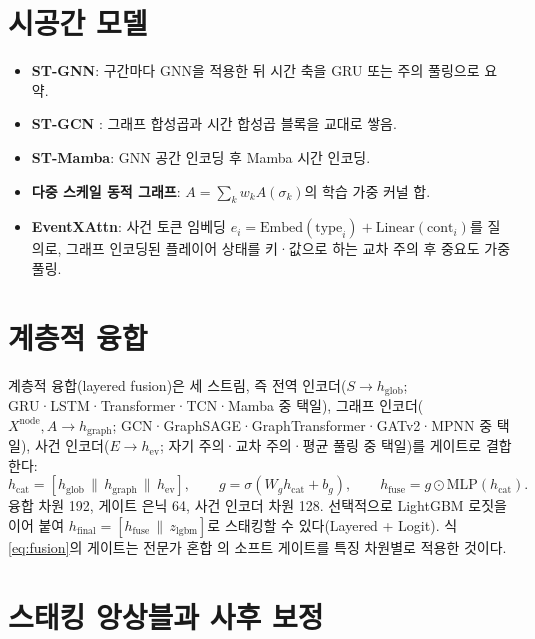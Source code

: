 \section{시공간 모델}
\label{sec:model-st}

\begin{itemize}[leftmargin=1.5em]
  \item \textbf{ST-GNN}: 구간마다 GNN을 적용한 뒤 시간 축을 GRU 또는 주의 풀링으로 요약.
  \item \textbf{ST-GCN} \cite{yan2018spatial}: 그래프 합성곱과 시간 합성곱 블록을 교대로 쌓음.
  \item \textbf{ST-Mamba}: GNN 공간 인코딩 후 Mamba 시간 인코딩.
  \item \textbf{다중 스케일 동적 그래프}: $A = \sum_k w_k A(\sigma_k)$의 학습 가중 커널 합.
  \item \textbf{EventXAttn}: 사건 토큰 임베딩 $e_i = \mathrm{Embed}(\mathrm{type}_i) + \mathrm{Linear}(\mathrm{cont}_i)$를 질의로, 그래프 인코딩된 플레이어 상태를 키·값으로 하는 교차 주의 후 중요도 가중 풀링.
\end{itemize}

\section{계층적 융합}
\label{sec:model-fusion}

계층적 융합(layered fusion)은 세 스트림, 즉 전역 인코더($S \to h_{\mathrm{glob}}$; GRU·LSTM·Transformer·TCN·Mamba 중 택일), 그래프 인코더($X^{\mathrm{node}}, A \to h_{\mathrm{graph}}$; GCN·GraphSAGE·GraphTransformer·GATv2·MPNN 중 택일), 사건 인코더($E \to h_{\mathrm{ev}}$; 자기 주의·교차 주의·평균 풀링 중 택일)를 게이트로 결합한다:
\begin{equation}
  h_{\mathrm{cat}} = [h_{\mathrm{glob}} \,\|\, h_{\mathrm{graph}} \,\|\, h_{\mathrm{ev}}], \qquad
  g = \sigma(W_g h_{\mathrm{cat}} + b_g), \qquad
  h_{\mathrm{fuse}} = g \odot \mathrm{MLP}(h_{\mathrm{cat}}).
  \label{eq:fusion}
\end{equation}
융합 차원 192, 게이트 은닉 64, 사건 인코더 차원 128. 선택적으로 LightGBM 로짓을 이어 붙여 $h_{\mathrm{final}} = [h_{\mathrm{fuse}} \,\|\, z_{\mathrm{lgbm}}]$로 스태킹할 수 있다(Layered + Logit). 식 \eqref{eq:fusion}의 게이트는 전문가 혼합 \cite{shazeer2017outrageously,ma2018modeling}의 소프트 게이트를 특징 차원별로 적용한 것이다.

\section{스태킹 앙상블과 사후 보정}
\label{sec:model-stacking}

